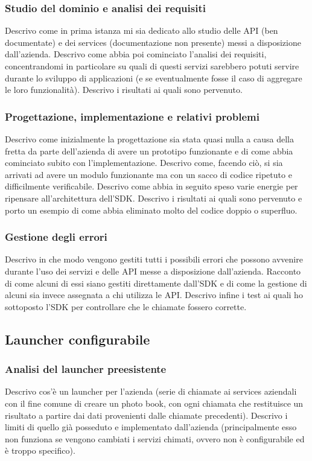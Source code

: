 			\subsubsection{Studio del dominio e analisi dei requisiti}
				Descrivo come in prima istanza mi sia dedicato allo studio delle API (ben documentate) e dei services (documentazione
				non presente) messi a disposizione dall'azienda. Descrivo come abbia poi cominciato l'analisi dei requisiti,
				concentrandomi in particolare su quali di questi servizi sarebbero potuti servire durante lo sviluppo di applicazioni
				(e se eventualmente fosse il caso di aggregare le loro funzionalità). Descrivo i risultati ai quali sono pervenuto.
			\subsubsection{Progettazione, implementazione e relativi problemi}
				Descrivo come inizialmente la progettazione sia stata quasi nulla a causa della fretta da parte dell'azienda di avere
				un prototipo funzionante e di come abbia cominciato subito con l'implementazione. Descrivo come, facendo ciò, si sia
				arrivati ad avere un modulo funzionante ma con un sacco di codice ripetuto e difficilmente verificabile. Descrivo
				come abbia in seguito speso varie energie per ripensare all'architettura dell'SDK. Descrivo i risultati ai quali sono
				pervenuto e porto un esempio di come abbia eliminato molto del codice doppio o superfluo.
			\subsubsection{Gestione degli errori}
				Descrivo in che modo vengono gestiti tutti i possibili errori che possono avvenire durante l'uso dei servizi e delle
				API messe a disposizione dall'azienda. Racconto di come alcuni di essi siano gestiti direttamente dall'SDK e di come
				la gestione di alcuni sia invece assegnata a chi utilizza le API. Descrivo infine i test ai quali ho sottoposto
				l'SDK per controllare che le chiamate fossero corrette.
		\subsection{Launcher configurabile}
			\subsubsection{Analisi del launcher preesistente}
				Descrivo cos'è un launcher per l'azienda (serie di chiamate ai services aziendali con il fine comune di creare un
				photo book, con ogni chiamata che restituisce un risultato a partire dai dati provenienti dalle chiamate precedenti).
				Descrivo i limiti di quello già posseduto e implementato dall'azienda (principalmente esso non funziona se vengono
				cambiati i servizi chimati, ovvero non è configurabile ed è troppo specifico).
